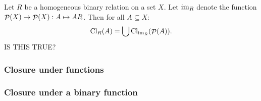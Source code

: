 \begin{lemma}
Let $R$ be a homogeneous binary relation on a set $X$. Let $\operatorname{im}_R$ denote the function $\mathop{\mathcal{P}}(X) \to \mathop{\mathcal{P}}(X): A \mapsto AR$. Then for all $A\subseteq X$:
\[ \operatorname{Cl}_R(A) = \bigcup \operatorname{Cl}_{\operatorname{im}_R}(\mathop{\mathcal{P}}(A)). \]
IS THIS TRUE?
\end{lemma}

\subsubsection{Closure under functions}

\subsubsection{Closure under a binary function}
